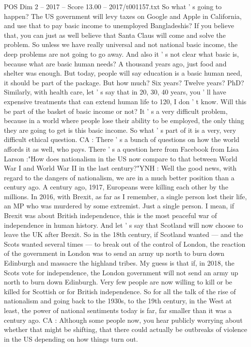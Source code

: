 \begin{textsample}{POS Dim 2 – 2017 – Score 13.00 – 2017/t001157.txt}
So what ' s going to happen?
The US government will levy taxes on Google and Apple in California, and use that to pay basic income to unemployed Bangladeshis?
If you believe that, you can just as well believe that Santa Claus will come and solve the problem.
So unless we have really universal and not national basic income, the deep problems are not going to go away.
And also it ' s not clear what basic is, because what are basic human needs?
A thousand years ago, just food and shelter was enough.
But today, people will say education is a basic human need, it should be part of the package.
But how much?
Six years?
Twelve years?
PhD?
Similarly, with health care, let ' s say that in 20, 30, 40 years, you ' ll have expensive treatments that can extend human life to 120, I don ' t know.
Will this be part of the basket of basic income or not?
It ' s a very difficult problem, because in a world where people lose their ability to be employed, the only thing they are going to get is this basic income.
So what ' s part of it is a very, very difficult ethical question.
CA : There ' s a bunch of questions on how the world affords it as well, who pays.
There ' s a question here from Facebook from Lisa Larson :"How does nationalism in the US now compare to that between World War I and World War II in the last century?"YNH : Well the good news, with regard to the dangers of nationalism, we are in a much better position than a century ago.
A century ago, 1917, Europeans were killing each other by the millions.
In 2016, with Brexit, as far as I remember, a single person lost their life, an MP who was murdered by some extremist.
Just a single person.
I mean, if Brexit was about British independence, this is the most peaceful war of independence in human history.
And let ' s say that Scotland will now choose to leave the UK after Brexit.
So in the 18th century, if Scotland wanted — and the Scots wanted several times — to break out of the control of London, the reaction of the government in London was to send an army up north to burn down Edinburgh and massacre the highland tribes.
My guess is that if, in 2018, the Scots vote for independence, the London government will not send an army up north to burn down Edinburgh.
Very few people are now willing to kill or be killed for Scottish or for British independence.
So for all the talk of the rise of nationalism and going back to the 1930s, to the 19th century, in the West at least, the power of national sentiments today is far, far smaller than it was a century ago.
CA : Although some people now, you hear publicly worrying about whether that might be shifting, that there could actually be outbreaks of violence in the US depending on how things turn out.

\end{textsample}
